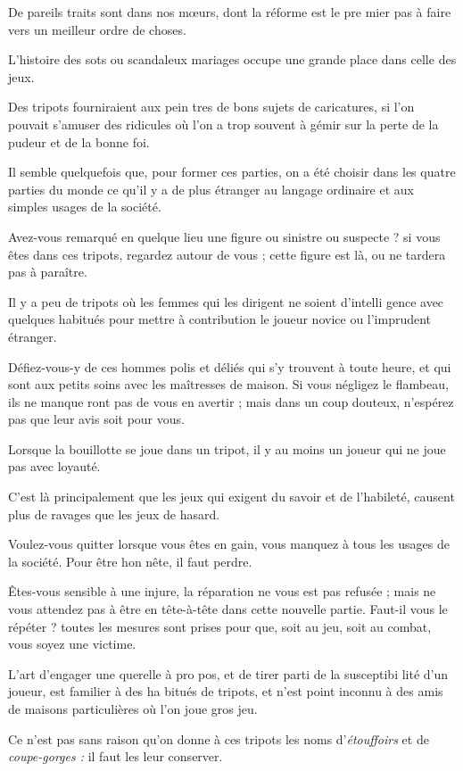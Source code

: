 De pareils traits sont dans nos 
mœurs, dont la réforme est le pre%
mier pas à faire vers un meilleur
ordre de choses.

L'histoire des sots ou scandaleux
mariages occupe une grande place
dans celle des jeux.

Des tripots fourniraient aux pein%
tres de bons sujets de caricatures, si
l'on pouvait s'amuser des ridicules
où l'on a trop souvent à gémir sur la
perte de la pudeur et de la bonne foi.

Il semble quelquefois que, pour
former ces parties, on a été choisir
dans les quatre parties du monde ce
qu'il y a de plus étranger au langage
ordinaire et aux simples usages de la 
société.

Avez-vous remarqué en quelque
lieu une figure ou sinistre ou suspecte ?
si vous êtes dans ces tripots, regardez
autour de vous ; cette figure est là, ou
ne tardera pas à paraître.

Il y a peu de tripots où les femmes
qui les dirigent ne soient d'intelli%
gence avec quelques habitués pour
mettre à contribution le joueur novice
ou l'imprudent étranger.

Défiez-vous-y de ces hommes polis
et déliés qui s'y trouvent à toute
heure, et qui sont aux petits soins
avec les maîtresses de maison. Si vous
négligez le flambeau, ils ne manque%
ront pas de vous en avertir ; mais dans
un coup douteux, n'espérez pas que
leur avis soit pour vous.

Lorsque la bouillotte se joue dans
un tripot, il y au moins un joueur
qui ne joue pas avec loyauté.

C'est là principalement que les jeux
qui exigent du savoir et de l'habileté,
causent plus de ravages que les jeux
de hasard.

Voulez-vous quitter lorsque vous
êtes en gain, vous manquez à tous les
usages de la société. Pour être hon%
nête, il faut perdre.

Êtes-vous sensible à une injure, la
réparation ne vous est pas refusée ;
mais ne vous attendez pas à être en
tête-à-tête dans cette nouvelle partie.
Faut-il vous le répéter ? toutes les
mesures sont prises pour que, soit au
jeu, soit au combat, vous soyez une
victime.

L'art d'engager une querelle à pro%
pos, et de tirer parti de la susceptibi%
lité d'un joueur, est familier à des ha%
bitués de tripots, et n'est point inconnu
à des amis de maisons particulières
où l'on joue gros jeu.

Ce n'est pas sans raison qu'on donne
à ces tripots les noms d'\emph{étouffoirs} et de
\emph{coupe-gorges :} il faut les leur conserver.

